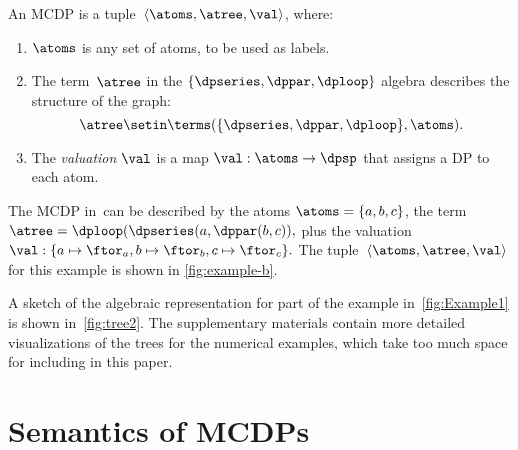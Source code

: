 \begin{definition}
    \label{def:MCDP-algebraic}
    An MCDP is a tuple~$\left\langle \atoms,\atree,\val\right\rangle $,
    where:
    \begin{enumerate}
        \item $\atoms$ is any set of atoms, to be used as labels.
        \item The term~$\atree$ in the $\{\dpseries,\dppar,\dploop\}$ algebra
              describes the structure of the graph:
              \[
                  \atree\setin\terms(\{\dpseries,\dppar,\dploop\},\atoms).
              \]
        \item The \emph{valuation} $\val$ is a map $\val:\atoms\rightarrow\dpsp$
              that assigns a DP to each atom.
    \end{enumerate}
\end{definition}
\begin{example}
    The MCDP in~\XXX can be described by the atoms
    $\atoms=\{a,b,c\}$, the term $\atree=\dploop(\dpseries(a,\dppar(b,c)),$
    plus the valuation $\val:\{a\mapsto\ftor_{a},b\mapsto\ftor_{b},c\mapsto\ftor_{c}\}.
    $
    The tuple~$\left\langle \atoms,\atree,\val\right\rangle $ for this
    example is shown in \cref{fig:example-b}.
\end{example}
\begin{example}
    A sketch of the algebraic representation for part of the example in~\cref{fig:Example1}
    is shown in~\cref{fig:tree2}.
    The supplementary materials contain
    more detailed visualizations of the trees for the numerical examples,
    which take too much space for including in this paper.
\end{example}

\section{Semantics of MCDPs}

